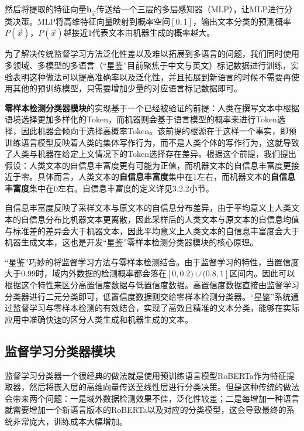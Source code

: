 \documentclass[a4paper]{report}
\begin{document}
然后将提取的特征向量$\mathbf{h}_{\vec{x}}$传送给一个三层的多层感知器（MLP），让MLP进行分类决策。MLP将高维特征向量映射到概率空间$[0,1]$，输出文本分类的预测概率$P(\vec{x})$，$P(\vec{x})$越接近1代表文本由机器生成的概率越大。

为了解决传统监督学习方法泛化性差以及难以拓展到多语言的问题，我们同时使用多领域、多模型的多语言（“星鉴”目前聚焦于中文与英文）标记数据进行训练，实验表明这种做法可以提高准确率以及泛化性，并且拓展到新语言的时候不需要再使用其他的预训练模型，只需要增加少量的对应语言标记数据即可。

\textbf{零样本检测分类器模块}的实现基于一个已经被验证的前提：人类在撰写文本中根据语境选择更加多样化的Token，而机器则会基于语言模型的概率来进行Token选择，因此机器会倾向于选择高概率Token。该前提的根源在于这样一个事实，即预训练语言模型反映着人类的集体写作行为，而不是人类个体的写作行为，这就导致了人类与机器在给定上文情况下的Token选择存在差异。根据这个前提，我们提出假设：人类文本的自信息丰富度更有可能为正值，而机器文本的自信息丰富度更接近于零。具体而言，人类文本的\textbf{自信息丰富度}集中在1左右，而机器文本的\textbf{自信息丰富度}集中在0左右。自信息丰富度的定义详见3.2.2小节。

自信息丰富度反映了采样文本与原文本的自信息分布差异，由于平均意义上人类文本的自信息分布比机器文本更离散，因此采样后的人类文本与原文本的自信息均值与标准差的差异会大于机器文本，因此平均意义上人类文本的自信息丰富度会大于机器生成文本，这也是开发“星鉴”零样本检测分类器模块的核心原理。

“星鉴”巧妙的将监督学习方法与零样本检测结合。由于监督学习的特性，当置信度大于0.99时，域内外数据的检测概率都会落在$[0,0.2)\cup(0.8,1]$区间内。因此可以根据这个特性来区分高置信度数据与低置信度数据。高置信度数据直接由监督学习分类器进行二元分类即可，低置信度数据则交给零样本检测分类器。“星鉴”系统通过监督学习与零样本检测的有效结合，实现了高效且精准的文本分类，能够在实际应用中准确快速的区分人类生成和机器生成的文本。


\subsection{监督学习分类器模块}
监督学习分类器一个很经典的做法就是使用预训练语言模型RoBERTa作为特征提取器，然后将嵌入层的高维向量传送至线性层进行分类决策。但是这种传统的做法会带来两个问题：一是域外数据检测效果不佳，泛化性较差；二是每增加一种语言就需要增加一个新语言版本的RoBERTa以及对应的分类模型，这会导致最终的系统非常庞大，训练成本大幅增加。
\end{document}
